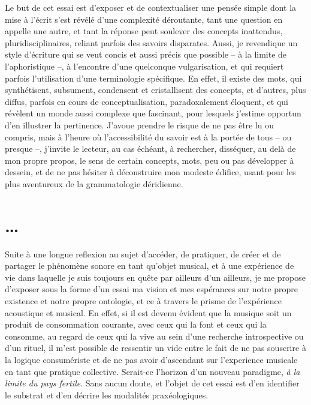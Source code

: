 \documentclass{article}
\begin{document}
Le but de cet essai est d'exposer et de contextualiser une pensée simple dont la mise à l'écrit s'est révélé d'une complexité déroutante, tant une question en appelle une autre, et tant la réponse peut soulever des concepts inattendus, pluridisciplinaires, reliant parfois des savoirs disparates. Aussi, 
je revendique un style d'écriture qui se veut concis et aussi précis que possible -- à la limite de l'aphoristique --, à l'encontre d'une quelconque vulgarisation, et qui requiert parfois l'utilisation d'une terminologie spécifique. En effet, il existe des mots, qui synthétisent, subsument, condensent et cristallisent des concepts, 
et d'autres, plus diffus, parfois en cours de conceptualisation, paradoxalement éloquent, 
et qui révèlent un monde aussi complexe que fascinant, pour lesquels j'estime opportun d'en illustrer la pertinence.
J'avoue prendre le risque de ne pas être lu ou compris, mais à l'heure où l'accessibilité du savoir est à la portée de tous -- ou presque --, j'invite le lecteur, au cas échéant, à rechercher, disséquer, au delà de mon propre propos, le sens de certain concepts, mots, peu ou pas développer à dessein, et de ne pas hésiter à déconstruire mon modeste édifice, usant pour les plus aventureux de la grammatologie déridienne.

\bigskip

\section{…}
Suite à une longue reflexion au sujet d'accéder, de pratiquer, de créer et de partager le phénomène sonore en tant qu'objet musical, et à une expérience de vie dans laquelle je suis toujours en quête par ailleurs d'un ailleurs, 
 je me propose d'exposer sous la forme d'un essai ma vision et mes espérances sur notre propre existence et notre propre ontologie, et ce à travers le prisme de l'expérience acoustique et musical. En effet, si il est devenu évident que la musique soit un produit de consommation courante, avec ceux qui la font et ceux qui la consomme, au regard de ceux qui la vive au sein d'une recherche introspective ou d'un rituel,
il m'est possible de ressentir un vide entre le fait de ne pas souscrire à la logique consumériste et de ne pas avoir d'ascendant sur l'experience musicale en tant que pratique collective.
Serait-ce l'horizon d'un nouveau paradigme, \textit{à la limite du pays fertile}. Sans aucun doute, et l'objet de cet essai est d'en identifier le substrat et d'en décrire les modalités praxéologiques\label{efn:pr}. 
\end{document}
